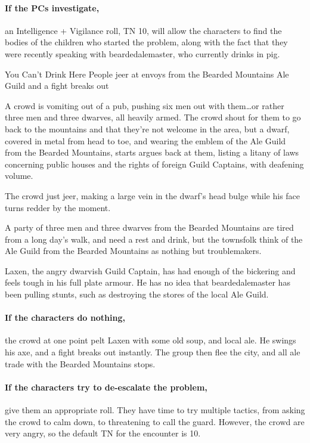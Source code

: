 \begin{multicols}{2}
\paragraph{If the PCs investigate,}
an Intelligence + Vigilance roll, TN 10, will allow the characters to find the bodies of the children who started the problem, along with the fact that they were recently speaking with \gls{beardedalemaster}, who currently drinks in \gls{pig}.

{You Can't Drink Here}%
{People jeer at envoys from the Bearded Mountains Ale Guild and a fight breaks out}%

\begin{boxtext}

	A crowd is vomiting out of a pub, pushing six men out with them\ldots or rather three men and three dwarves, all heavily armed.
	The crowd shout for them to go back to the mountains and that they're not welcome in the area, but a dwarf, covered in metal from head to toe, and wearing the emblem of the Ale Guild from the Bearded Mountains, starts argues back at them, listing a litany of laws concerning public houses and the rights of foreign Guild Captains, with deafening volume.

	The crowd just jeer, making a large vein in the dwarf's head bulge while his face turns redder by the moment.

\end{boxtext}

A party of three men and three dwarves from the Bearded Mountains are tired from a long day's walk, and need a rest and drink, but the townsfolk think of the Ale Guild from the Bearded Mountains as nothing but troublemakers.

Laxen, the angry dwarvish Guild Captain, has had enough of the bickering and feels tough in his full plate armour.
He has no idea that \gls{beardedalemaster} has been pulling stunts, such as destroying the stores of the local Ale Guild.

\paragraph{If the characters do nothing,}
the crowd at one point pelt Laxen with some old soup, and local ale.
He swings his axe, and a fight breaks out instantly.
The group then flee the city, and all ale trade with the Bearded Mountains stops.

\paragraph{If the characters try to de-escalate the problem,}
give them an appropriate roll.
They have time to try multiple tactics, from asking the crowd to calm down, to threatening to call the guard.
However, the crowd are very angry, so the default TN for the encounter is 10.


\end{multicols}

